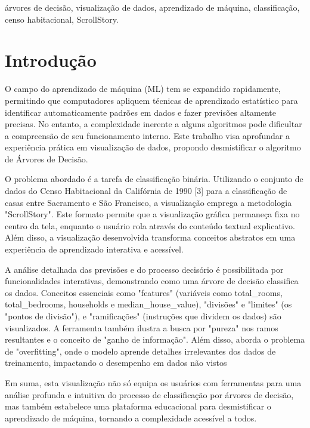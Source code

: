 \documentclass[conference]{IEEEtran}
\begin{document}
\begin{IEEEkeywords}
árvores de decisão, visualização de dados, aprendizado de máquina, classificação, censo habitacional, ScrollStory.
\end{IEEEkeywords}

\section{Introdução}
O campo do aprendizado de máquina (ML) tem se expandido rapidamente, permitindo que computadores apliquem técnicas de aprendizado estatístico para identificar automaticamente padrões em dados e fazer previsões altamente precisas. No entanto, a complexidade inerente a alguns algoritmos pode dificultar a compreensão de seu funcionamento interno. Este trabalho visa aprofundar a experiência prática em visualização de dados, propondo desmistificar o algoritmo de Árvores de Decisão.

O problema abordado é a tarefa de classificação binária. Utilizando o conjunto de dados do Censo Habitacional da Califórnia de 1990 [3]  para a classificação de casas entre Sacramento e São Francisco, a visualização emprega a metodologia "ScrollStory". Este formato permite que a visualização gráfica permaneça fixa no centro da tela, enquanto o usuário rola através do conteúdo textual explicativo. Além disso, a visualização desenvolvida transforma conceitos abstratos em uma experiência de aprendizado interativa e acessível.

A análise detalhada das previsões e do processo decisório é possibilitada por funcionalidades interativas, demonstrando como uma árvore de decisão classifica os dados. Conceitos essenciais como "features" (variáveis como total\_rooms, total\_bedrooms, households e median\_house\_value), "divisões" e "limites" (os "pontos de divisão"), e "ramificações" (instruções que dividem os dados) são visualizados. A ferramenta também ilustra a busca por "pureza" nos ramos resultantes e o conceito de "ganho de informação". Além disso, aborda o problema de "overfitting", onde o modelo aprende detalhes irrelevantes dos dados de treinamento, impactando o desempenho em dados não vistos

Em suma, esta visualização não só equipa os usuários com ferramentas para uma análise profunda e intuitiva do processo de classificação por árvores de decisão, mas também estabelece uma plataforma educacional para desmistificar o aprendizado de máquina, tornando a complexidade acessível a todos.
\end{document}
